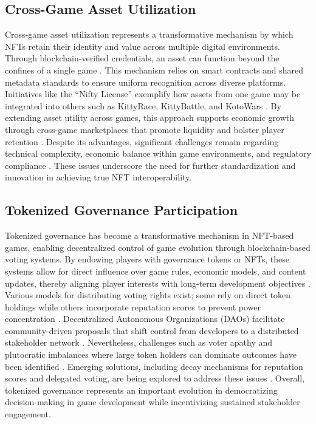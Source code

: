 \subsection{Cross-Game Asset Utilization}

Cross-game asset utilization represents a transformative mechanism by which NFTs
retain their identity and value across multiple digital environments. Through
blockchain-verified credentials, an asset can function beyond the confines of a
single game \cite{popescuNonFungibleTokensNFT2021}. This mechanism relies on
smart contracts and shared metadata standards to ensure uniform recognition
across diverse platforms. Initiatives like the “Nifty License” exemplify how
assets from one game may be integrated into others such as KittyRace,
KittyBattle, and KotoWars \cite{minBlockchainGamesSurvey2019}. By extending
asset utility across games, this approach supports economic growth through
cross-game marketplaces that promote liquidity and bolster player retention
\cite{choiStudyElementsBusiness2021}. Despite its advantages, significant
challenges remain regarding technical complexity, economic balance within game
environments, and regulatory compliance \cite{shiApplicationsNFTsAI2024}. These
issues underscore the need for further standardization and innovation in
achieving true NFT interoperability.

\subsection{Tokenized Governance Participation}

Tokenized governance has become a transformative mechanism in NFT-based games,
enabling decentralized control of game evolution through blockchain-based voting
systems. By endowing players with governance tokens or NFTs, these systems allow
for direct influence over game rules, economic models, and content updates,
thereby aligning player interests with long-term development objectives
\cite{muhammadDeterminantsAINonFungible2023}. Various models for distributing
voting rights exist; some rely on direct token holdings while others incorporate
reputation scores to prevent power concentration
\cite{chenFrameworkBasedDAO2024}. Decentralized Autonomous Organizations (DAOs)
facilitate community-driven proposals that shift control from developers to a
distributed stakeholder network \cite{shazhaevPlaytoHashEconomicsMetaverses2022,
	yuSoKPlaytoEarnProjects2022a}. Nevertheless, challenges such as voter apathy and
plutocratic imbalances where large token holders can dominate outcomes have been
identified \cite{yuSoKPlaytoEarnProjects2022a, conlonProblemNFTs2023}. Emerging
solutions, including decay mechanisms for reputation scores and delegated
voting, are being explored to address these issues
\cite{chenFrameworkBasedDAO2024, stamatakisBlockchainPoweredGamingBridging2024}.
Overall, tokenized governance represents an important evolution in democratizing
decision-making in game development while incentivizing sustained stakeholder
engagement.

